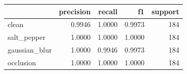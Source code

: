 \begin{tabular}{lrrrr}
\toprule
 & precision & recall & f1 & support \\
\midrule
clean & 0.9946 & 1.0000 & 0.9973 & 184 \\
salt_pepper & 1.0000 & 1.0000 & 1.0000 & 184 \\
gaussian_blur & 1.0000 & 0.9946 & 0.9973 & 184 \\
occlusion & 1.0000 & 1.0000 & 1.0000 & 184 \\
\bottomrule
\end{tabular}
